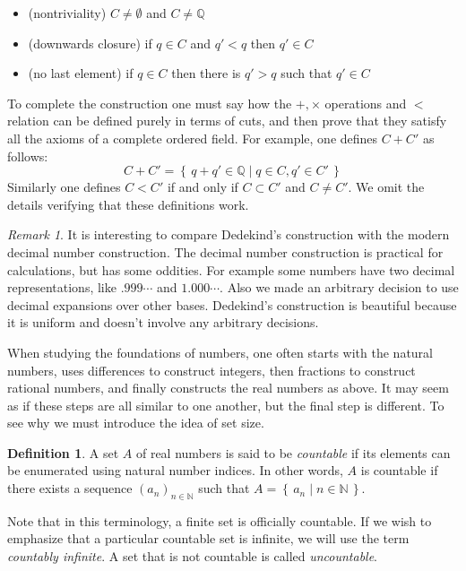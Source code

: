 \documentclass[11pt,oneside,a4paper]{amsbook}
\newcommand{\set}[1]{\left\{\,#1\,\right\}}
\newcommand{\N}{\mathbb N}
\newcommand{\Q}{\mathbb Q}
\theoremstyle{definition}
\theoremstyle{plain}
\theoremstyle{definition}
\newtheorem{definition}[theorem]{Definition}
\theoremstyle{remark}
\newtheorem{remark}[theorem]{Remark}
\numberwithin{equation}{section}
\numberwithin{figure}{section}
\begin{document}
\begin{itemize}
  \item (nontriviality) $C\neq\emptyset$ and $C\neq\Q$
  \item (downwards closure) if $q\in C$ and $q'<q$ then $q'\in C$
  \item (no last element) if $q\in C$ then there is $q'>q$ such that $q'\in C$
\end{itemize}

To complete the construction one must say how the $+,\times$ operations and $<$ relation can be defined purely in terms of cuts, and then prove that they satisfy all the axioms of a complete ordered field. For example, one defines $C+C'$ as follows:
\[C+C'=\set{q+q'\in\Q\mid q\in C,q'\in C'}
\]
Similarly one defines $C<C'$ if and only if $C\subset C'$ and $C\neq C'$. We omit the details verifying that these definitions work.

\begin{remark}
  It is interesting to compare Dedekind's construction with the modern decimal number construction. The decimal number construction is practical for calculations, but has some oddities. For example some numbers have two decimal representations, like $.999\cdots$ and $1.000\cdots$. Also we made an arbitrary decision to use decimal expansions over other bases. Dedekind's construction is beautiful because it is uniform and doesn't involve any arbitrary decisions.
\end{remark}

When studying the foundations of numbers, one often starts with the natural numbers, uses differences to construct integers, then fractions to construct rational numbers, and finally constructs the real numbers as above. It may seem as if these steps are all similar to one another, but the final step is different. To see why we must introduce the idea of set size.

\begin{definition}
  A set $A$ of real numbers is said to be \emph{countable} if its elements can be enumerated using natural number indices. In other words, $A$ is countable if there exists a sequence $(a_n)_{n\in\N}$ such that $A=\set{a_n\mid n\in\N}$.
\end{definition}

Note that in this terminology, a finite set is officially countable. If we wish to emphasize that a particular countable set is infinite, we will use the term \emph{countably infinite}. A set that is not countable is called \emph{uncountable}.
\end{document}
